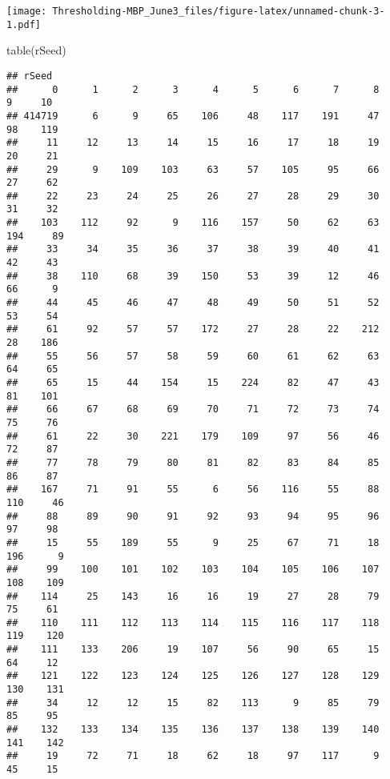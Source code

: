 \documentclass[
]{article}
\newenvironment{Shaded}{\begin{snugshade}}{\end{snugshade}}
\newcommand{\FunctionTok}[1]{\textcolor[rgb]{0.00,0.00,0.00}{#1}}
\newcommand{\NormalTok}[1]{#1}
\begin{document}
\texttt{[image: Thresholding-MBP\_June3\_files/figure-latex/unnamed-chunk-3-1.pdf]}

\begin{Shaded}
\begin{Highlighting}[]
\FunctionTok{table}\NormalTok{(rSeed)}
\end{Highlighting}
\end{Shaded}

\begin{verbatim}
## rSeed
##      0      1      2      3      4      5      6      7      8      9     10 
## 414719      6      9     65    106     48    117    191     47     98    119 
##     11     12     13     14     15     16     17     18     19     20     21 
##     29      9    109    103     63     57    105     95     66     27     62 
##     22     23     24     25     26     27     28     29     30     31     32 
##    103    112     92      9    116    157     50     62     63    194     89 
##     33     34     35     36     37     38     39     40     41     42     43 
##     38    110     68     39    150     53     39     12     46     66      9 
##     44     45     46     47     48     49     50     51     52     53     54 
##     61     92     57     57    172     27     28     22    212     28    186 
##     55     56     57     58     59     60     61     62     63     64     65 
##     65     15     44    154     15    224     82     47     43     81    101 
##     66     67     68     69     70     71     72     73     74     75     76 
##     61     22     30    221    179    109     97     56     46     72     87 
##     77     78     79     80     81     82     83     84     85     86     87 
##    167     71     91     55      6     56    116     55     88    110     46 
##     88     89     90     91     92     93     94     95     96     97     98 
##     15     55    189     55      9     25     67     71     18    196      9 
##     99    100    101    102    103    104    105    106    107    108    109 
##    114     25    143     16     16     19     27     28     79     75     61 
##    110    111    112    113    114    115    116    117    118    119    120 
##    111    133    206     19    107     56     90     65     15     64     12 
##    121    122    123    124    125    126    127    128    129    130    131 
##     34     12     12     15     82    113      9     85     79     85     95 
##    132    133    134    135    136    137    138    139    140    141    142 
##     19     72     71     18     62     18     97    117      9     45     15
\end{verbatim}
\end{document}
